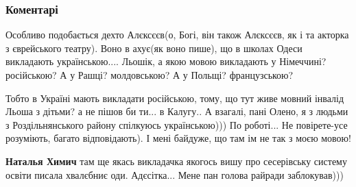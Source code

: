  
 
 
 
 
\subsubsection{Коментарі}
\label{sec:27_07_2021.fb.blazhieva_elena.1.mova_shkola.cmt}

\begin{itemize}
 

Особливо подобається дехто Алєксєєв(о, Богі, він також Алєксєєв, як і та акторка з
єврейського театру). Воно в ахує(як воно пише), що в школах Одеси викладають
українською.... Льошік, а якою мовою викладають у Німеччині? російською? А у
Рашці? молдовською? А у Польщі? французською?

Тобто в Україні мають викладати російською, тому, що тут живе мовний інвалід
Льоша з дітьми? а не пішов би ти... в Калугу.. А взагалі, пані Олено, я з людьми з
Роздільнянського району спілкуюсь українською))) По роботі... Не повірете-усе
розуміють, багато відповідають). І мені байдуже, що там ім не так з моєю мовою!

\begin{itemize}
 
\textbf{Наталья Химич} там ще якась викладачка якогось вишу про сесерівську систему освіти писала хвалєбниє оди. Адєсітка...
Мене пан голова райради заблокував)))
\end{itemize}

 

\end{itemize}
